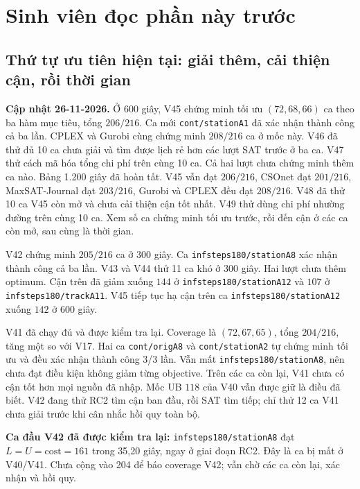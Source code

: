 \documentclass[11pt,a4paper]{article}
\newcommand{\code}[1]{\texttt{#1}}
\begin{document}
\hypersetup{pageanchor=true}
\tableofcontents
\newpage

\section{Sinh viên đọc phần này trước}

\subsection{Thứ tự ưu tiên hiện tại: giải thêm, cải thiện cận, rồi thời gian}

\textbf{Cập nhật 26-11-2026.} Ở 600 giây, V45 chứng minh tối ưu
$(72,68,66)$ ca theo ba hàm mục tiêu, tổng $206/216$. Ca mới
\code{cont/stationA1} đã xác nhận thành công cả ba lần. CPLEX và
Gurobi cùng chứng minh $208/216$ ca ở mốc này. V46 đã thử đủ 10 ca
chưa giải và tìm được lịch rẻ hơn các lượt SAT trước ở ba ca.
V47 thử cách mã hóa tổng chi phí trên cùng 10 ca. Cả hai lượt
chưa chứng minh thêm ca nào. Bảng 1.200 giây đã hoàn tất.
V45 vẫn đạt $206/216$, CSOnet đạt $201/216$, MaxSAT-Journal
đạt $203/216$, Gurobi và CPLEX đều đạt $208/216$.
V48 đã thử 10 ca V45 còn mở và chưa cải thiện cận tốt nhất.
V49 thử dùng chi phí nhường đường trên cùng 10 ca. Xem số ca chứng minh
tối ưu trước, rồi đến cận ở các ca còn mở, sau cùng là thời gian.

V42 chứng minh $205/216$ ca ở 300 giây. Ca
\code{infsteps180/stationA8} xác nhận thành công cả ba lần.
V43 và V44 thử 11 ca khó ở 300 giây. Hai lượt chưa thêm optimum.
Cận trên đã giảm xuống $144$ ở \code{infsteps180/stationA12} và
$107$ ở \code{infsteps180/trackA11}. V45 tiếp tục hạ cận trên ca
\code{infsteps180/stationA12} xuống $142$ ở 600 giây.

V41 đã chạy đủ và được kiểm tra lại. Coverage là
$(72,67,65)$, tổng $204/216$, tăng một so với V17. Hai ca
\code{cont/origA8} và \code{cont/stationA2} tự chứng minh tối ưu và đều
xác nhận thành công 3/3 lần. Vẫn mất \code{infsteps180/stationA8}, nên
chưa đạt điều kiện không giảm từng objective. Trên các ca còn lại, V41
chưa có cận tốt hơn mọi nguồn đã nhập. Mốc UB $118$ của V40 vẫn được giữ
 là điều đã biết. V42 đang thử RC2 tìm cận ban đầu, rồi SAT tìm tiếp; chỉ
thử 12 ca V41 chưa giải trước khi cân nhắc hồi quy toàn bộ.

\textbf{Ca đầu V42 đã được kiểm tra lại:}
\code{infsteps180/stationA8} đạt $L=U=\mathrm{cost}=161$ trong 35,20
giây, ngay ở giai đoạn RC2. Đây là ca bị mất ở V40/V41. Chưa cộng vào
204 để báo coverage V42; vẫn chờ các ca còn lại, xác nhận và hồi quy.
\end{document}

